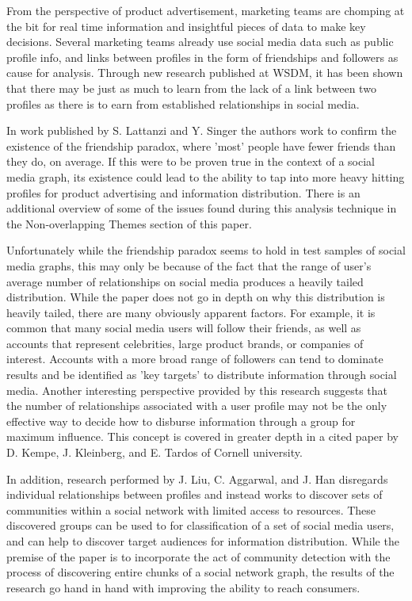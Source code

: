\documentclass{sig-alternate}
\begin{document}
From the perspective of product advertisement, marketing teams are chomping at the bit for real time
information and insightful pieces of data to make key decisions. Several marketing teams already use
social media data such as public profile info, and links between profiles in the form of friendships and 
followers as cause for analysis. Through new research published at WSDM, it has been shown that there may be just as much
to learn from the lack of a link between two profiles as there is to earn from established relationships
in social media. 

In work published by S. Lattanzi and Y. Singer\cite{DBLP:conf/wsdm/LattanziS15} the authors work to confirm the
existence of the friendship paradox, where 'most' people have fewer friends than they do, on average. If this
were to be proven true in the context of a social media graph, its existence could lead to the ability
to tap into more heavy hitting profiles for product advertising and information distribution.
There is an additional overview of some of the issues found during this analysis technique in the Non-overlapping Themes section of this paper. 

Unfortunately while the friendship paradox seems to hold in test samples of social media graphs, this may
only be because of the fact that the range of user's average number of relationships on social media
produces a heavily tailed distribution. While the paper does not go in depth on why this distribution is heavily
tailed, there are many obviously apparent factors. For example, it is common that many social media 
users will follow their friends, as well as accounts that represent celebrities, large product brands, 
or companies of interest. Accounts with a more broad range of followers can tend to dominate results 
and be identified as 'key targets' to distribute information through social media. Another interesting
perspective provided by this research suggests that the number of relationships associated with a user profile
may not be the only effective way to decide how to disburse information through a group for maximum influence.
This concept is covered in greater depth in a cited paper by D. Kempe, J. Kleinberg, and E. Tardos of Cornell university.
\cite{kdd03-cornell}

In addition, research performed by J. Liu, C. Aggarwal, and J. Han \cite{Liu:2015:INC:2684822.2685323} disregards individual relationships between profiles
and instead works to discover sets of communities within a social network with limited access to resources. These
discovered groups can be used to for classification of a set of social media users, and can help to discover 
target audiences for information distribution. While the premise of the paper is to incorporate the act of
community detection with the process of discovering entire chunks of a social network graph, the results of the 
research go hand in hand with improving the ability to reach consumers. 
\end{document}
